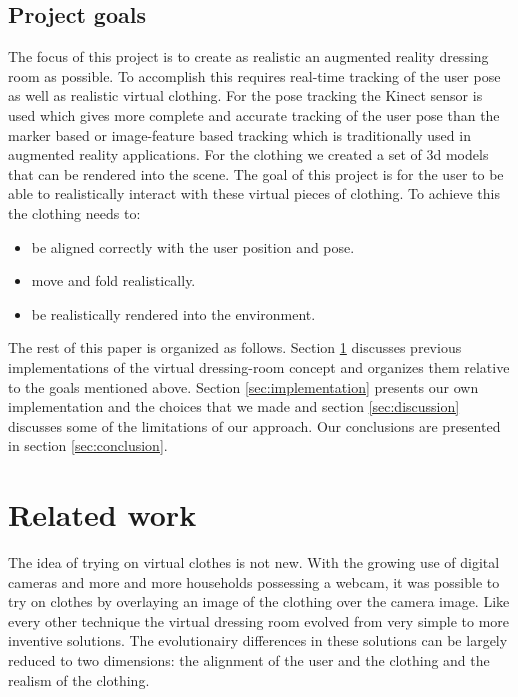 \documentclass[twocolumn,a4paper]{article}
\begin{document}

\subsection{Project goals}
\label{sec:project_goals}

The focus of this project is to create as realistic an augmented reality dressing room as possible. To accomplish this requires real-time tracking of the user pose as well as realistic virtual clothing. For the pose tracking the Kinect sensor is used which gives more complete and accurate tracking of the user pose than the marker based or image-feature based tracking which is traditionally used in augmented reality applications. For the clothing we created a set of 3d models that can be rendered into the scene. The goal of this project is for the user to be able to realistically interact with these virtual pieces of clothing. To achieve this the clothing needs to:
\begin{itemize}
\item be aligned correctly with the user position and pose.
\item move and fold realistically. 
\item be realistically rendered into the environment.
\end{itemize}

The rest of this paper is organized as follows. Section \ref{sec:related_work} discusses previous implementations of the virtual dressing-room concept and organizes them relative to the goals mentioned above. Section \ref{sec:implementation} presents our own implementation and the choices that we made and section \ref{sec:discussion} discusses some of the limitations of our approach. Our conclusions are presented in section \ref{sec:conclusion}.


\section{Related work}
\label{sec:related_work}

The idea of trying on virtual clothes is not new. With the growing use of digital cameras and more and more households possessing a webcam, it was possible to try on clothes by overlaying an image of the clothing over the camera image. Like every other technique the virtual dressing room evolved from very simple to more inventive solutions. The evolutionairy differences in these solutions can be largely reduced to two dimensions: the alignment of the user and the clothing and the realism of the clothing.
\end{document}
